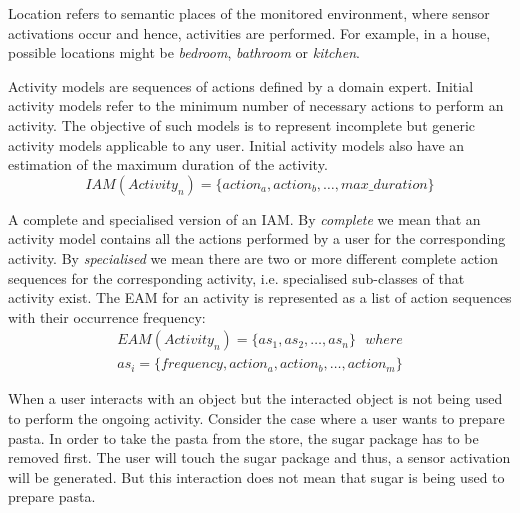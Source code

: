 \begin{defn}[Location]
\label{def-location}
 Location refers to semantic places of the monitored environment, where sensor activations occur and hence, activities are performed. For example, in a house, possible locations might be \textit{bedroom}, \textit{bathroom} or \textit{kitchen}. 
\end{defn}

\begin{defn}
\label{def-iam}
Activity models are sequences of actions defined by a domain expert. Initial activity models refer to the minimum number of necessary actions to perform an activity. The objective of such models is to represent incomplete but generic activity models applicable to any user. Initial activity models also have an estimation of the maximum duration of the activity.
\begin{equation}
  IAM(Activity_n) = \{action_a, action_b, \ldots , max\_duration\}
 \end{equation} 
\end{defn}

\begin{defn}
\label{def-eam}
 A complete and specialised version of an IAM. By \textit{complete} we mean that an activity model contains all the actions performed by a user for the corresponding activity. By \textit{specialised} we mean there are two or more different complete action sequences for the corresponding activity, i.e. specialised sub-classes of that activity exist. The EAM for an activity is represented as a list of action sequences with their occurrence frequency:
\begin{equation}
 \begin{split}
 EAM(Activity_n) = \{as_1, as_2, \ldots , as_n\} \ \ \ where \\
 as_i = \{frequency, action_a, action_b, \ldots, action_m\}
 \end{split}
 \label{eq-eam}
\end{equation}
\end{defn}

\begin{defn}
\label{def-erratic}
 When a user interacts with an object but the interacted object is not being used to perform the ongoing activity. Consider the case where a user wants to prepare pasta. In order to take the pasta from the store, the sugar package has to be removed first. The user will touch the sugar package and thus, a sensor activation will be generated. But this interaction does not mean that sugar is being used to prepare pasta. 
\end{defn}



